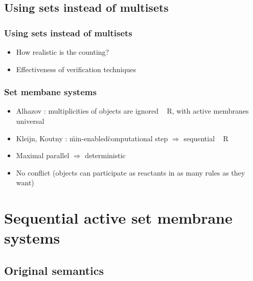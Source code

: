 
  \subsection{Using sets instead of multisets} %
  \label{sub:using_sets_instead_of_multisets}
    
    \begin{frame}[t]\frametitle{Using sets instead of multisets}
      \begin{itemize}
        \item How realistic is the counting?
        \item Effectiveness of verification techniques
      \end{itemize}
      
    \end{frame}
    \note{}

    \begin{frame}[t]\frametitle{Set membane systems}
      \begin{itemize}
        \item Alhazov \cite{Alhazov05WithoutMultiplicities}: multiplicities of objects are ignored ~ R, with active membranes universal
        \item Kleijn, Koutny \cite{Kleijn11SetMembrane}: \"min-enabled\" computational step $\Rightarrow$ sequential ~ R
        \item Maximal parallel $\Rightarrow$ deterministic
        \item No conflict (objects can participate as reactants in as many rules as they want)
      \end{itemize}
    \end{frame}
    \note{}



\section{Sequential active set membrane systems} %
\label{sec:sequential_active_set_membrane_systems}

  \subsection{Original semantics} %
  \label{sub:original_semantics}

